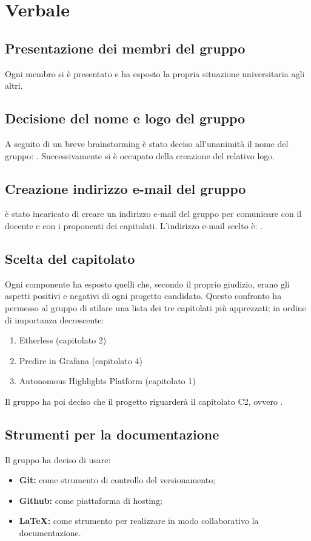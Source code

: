 \section{Verbale}
\subsection{Presentazione dei membri del gruppo}
Ogni membro si è presentato e ha esposto la propria situazione universitaria agli altri. 

\subsection{Decisione del nome e logo del gruppo}
A seguito di un breve brainstorming è stato deciso all'unanimità il nome del gruppo: \Gruppo.  Successivamente \AZ{} si è occupato della creazione del relativo logo. 

\subsection{Creazione indirizzo e-mail del gruppo}
\AZ{} è stato incaricato di creare un indirizzo e-mail del gruppo per comunicare con il docente e con i proponenti dei capitolati. 
L'indirizzo e-mail scelto è: \Mail.

\subsection{Scelta del capitolato}
Ogni componente ha esposto quelli che, secondo il proprio giudizio, erano gli aspetti positivi e negativi di ogni progetto candidato. Questo confronto ha permesso al gruppo di stilare una lista dei tre capitolati più apprezzati; in ordine di importanza decrescente: 
\begin{enumerate}
	\item Etherless (capitolato 2)
	\item Predire in Grafana (capitolato 4)
	\item Autonomous Highlights Platform (capitolato 1)
\end{enumerate}
Il gruppo ha poi deciso che il progetto riguarderà il capitolato C2, ovvero \NomeProgetto. 

\subsection{Strumenti per la documentazione} 
Il gruppo ha deciso di usare: 
\begin{itemize}
	\item \textbf{Git}\textbf{:} come strumento di controllo del versionamento; 
	\item \textbf{Github}\textbf{:} come piattaforma di hosting; 
	\item \textbf{\LaTeX{}}\textbf{:} come strumento per realizzare in modo collaborativo la documentazione. 
\end{itemize}

